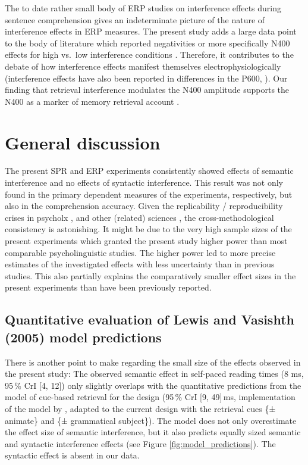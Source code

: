 \documentclass[a4paper, man, floatsintext]{apa7}
\begin{document}
The to date rather small body of ERP studies on interference effects during sentence comprehension gives an indeterminate picture of the nature of interference effects in ERP measures. The present study adds a large data point to the body of literature which reported negativities or more specifically N400 effects for high vs.\ low interference conditions \citep{vasishth_drenhaus_2011, martinetal2014, schoknecht2022, lee_garnsey}. Therefore, it contributes to the debate of how interference effects manifest themselves electrophysiologically (interference effects have also been reported in differences in the P600, \cite{Tanner_etal_2017, martinetal2014}). Our finding that retrieval interference modulates the N400 amplitude supports the N400 as a marker of memory retrieval account \citep{kutas&federmeier_2000, kutas_federmeier2011, brouwer2017_n4_p6, lau2008_n400}.

\section{General discussion}
The present SPR and ERP experiments consistently showed effects of semantic interference and no effects of syntactic interference. This result was not only found in the primary dependent measures of the experiments, respectively, but also in the comprehension accuracy. Given the replicability / reproducibility crises in psycholx \citep[see e.g., ][]{vasishth2018_signficancefilter}, and other (related) sciences \citep[see e.g., ][]{openscience2015_reproducibility}, the cross-methodological consistency is astonishing. It might be due to the very high sample sizes of the present experiments which granted the present study higher power than most comparable psycholinguistic studies. The higher power led to more precise estimates of the investigated effects with less uncertainty than in previous studies. This also partially explains the comparatively smaller effect sizes in the present experiments than have been previously reported.

\subsection{Quantitative evaluation of Lewis and
Vasishth (2005) model predictions}
There is another point to make regarding the small size of the effects observed in the present study: The observed semantic effect in self-paced reading times (8 ms, 95\,\% CrI [4, 12]) only slightly overlaps with the quantitative predictions from the \citet{Lewis2005} model of cue-based retrieval for the \citet{vandyke07} design (95\,\% CrI [9, 49]\,ms, implementation of the model by \cite{engelmann_etal_2019}, adapted to the current design with the retrieval cues \{± animate\} and \{± grammatical subject\}). The \citet{Lewis2005} model does not only overestimate the effect size of semantic interference, but it also predicts equally sized semantic and syntactic interference effects (see Figure \ref{fig:model_predictions}). The syntactic effect is absent in our data.
\end{document}
